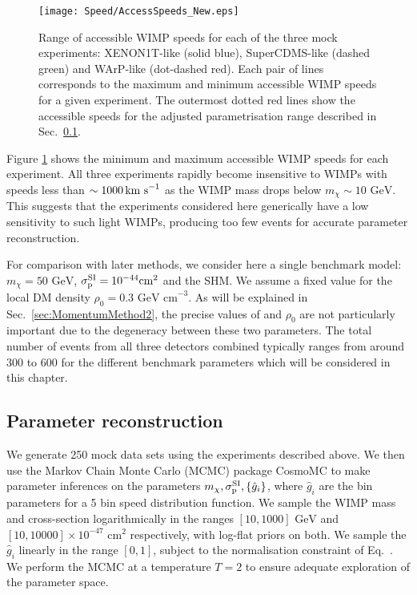 \begin{figure}[t]
  \centering
  \texttt{[image: Speed/AccessSpeeds\_New.eps]}
\caption[Range of accessible WIMP speeds for mock direct detection experiments]{Range of accessible WIMP speeds for each of the three mock experiments: XENON1T-like (solid blue), SuperCDMS-like (dashed green) and WArP-like (dot-dashed red). Each pair of lines corresponds to the maximum and minimum accessible WIMP speeds for a given experiment. The outermost dotted red lines show the accessible speeds for the adjusted parametrisation range described in Sec.\ \ref{}.}
  \label{fig:Speed:Access}
\end{figure}

Figure \ref{fig:Speed:Access} shows the minimum and maximum accessible WIMP speeds for each experiment. All three experiments rapidly become insensitive to WIMPs with speeds less than \(\sim 1000 \,\textrm{km s}^{-1}\) as the WIMP mass drops below \(m_\chi \sim 10 \textrm{ GeV}\). This suggests that the experiments considered here generically have a low sensitivity to such light WIMPs, producing too few events for accurate parameter reconstruction. 

For comparison with later methods, we consider here a single benchmark model: \(m_\chi = 50 \textrm{ GeV}\), $\sigmapsi = 10^{-44} \mathrm{cm}^2$ and the SHM. We assume a fixed value for the local DM density $\rho_0 = 0.3 \textrm{ GeV cm}^{-3}$. As will be explained in Sec.\ \ref{sec:MomentumMethod2}, the precise values of \sigmapsi and \(\rho_0\) are not particularly important due to the degeneracy between these two parameters. The total number of events from all three detectors combined typically ranges from around 300 to 600 for the different benchmark parameters which will be considered in this chapter.

\subsection{Parameter reconstruction}
We generate 250 mock data sets using the experiments described above. We then use the Markov Chain Monte Carlo (MCMC) package CosmoMC \cite{} to make parameter inferences on the parameters $\mchi, \sigmapsi, \left\{\hat{g}_i\right\}$, where $\hat{g}_i$ are the bin parameters for a 5 bin speed distribution function. We sample the WIMP mass and cross-section logarithmically in the ranges \([10, 1000] \textrm{ GeV}\) and \([10, 10000] \times 10^{-47} \textrm{ cm}^2\) respectively, with log-flat priors on both. We sample the $\hat{g}_i$ linearly in the range $[0,1]$, subject to the normalisation constraint of Eq.~\cite{eq:Speed:ghat}. We perform the MCMC at a temperature $T=2$ to ensure adequate exploration of the parameter space.

